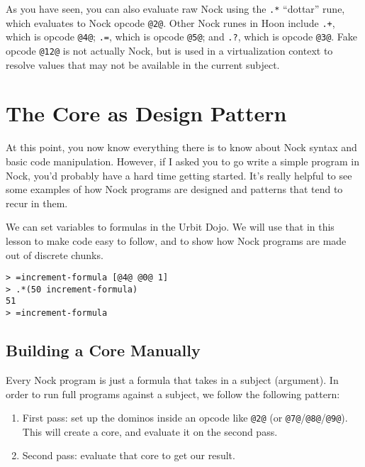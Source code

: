 \documentclass[twoside]{article}
\begin{document}
As you have seen, you can also evaluate raw Nock using the \lstinline[style=inlinecode]{.*} ``dottar'' rune, which evaluates to Nock opcode \lstinline[style=inlinecode]{@2@}.  Other Nock runes in Hoon include \lstinline[style=inlinecode]{.+}, which is opcode \lstinline[style=inlinecode]{@4@}; \lstinline[style=inlinecode]{.=}, which is opcode \lstinline[style=inlinecode]{@5@}; and \lstinline[style=inlinecode]{.?}, which is opcode \lstinline[style=inlinecode]{@3@}.  Fake opcode \lstinline[style=inlinecode]{@12@} is not actually Nock, but is used in a virtualization context to resolve values that may not be available in the current subject.

\section{The Core as Design Pattern}

At this point, you now know everything there is to know about Nock syntax and basic code manipulation.  However, if I asked you to go write a simple program in Nock, you'd probably have a hard time getting started. It's really helpful to see some examples of how Nock programs are designed and patterns that tend to recur in them.

We can set variables to formulas in the Urbit Dojo. We will use that in this lesson to make code easy to follow, and to show how Nock programs are made out of discrete chunks.

\begin{lstlisting}[style=listingcode]
> =increment-formula [@4@ @0@ 1]
> .*(50 increment-formula)
51
> =increment-formula
\end{lstlisting}

\subsection{Building a Core Manually}

Every Nock program is just a formula that takes in a subject (argument). In order to run full programs against a subject, we follow the following pattern:

\begin{enumerate}
  \item  First pass:  set up the dominos inside an opcode like \lstinline[style=inlinecode]{@2@} (or \lstinline[style=inlinecode]{@7@}/\lstinline[style=inlinecode]{@8@}/\lstinline[style=inlinecode]{@9@}). This will create a core, and evaluate it on the second pass.
  \item  Second pass:  evaluate that core to get our result.
\end{enumerate}
\end{document}
